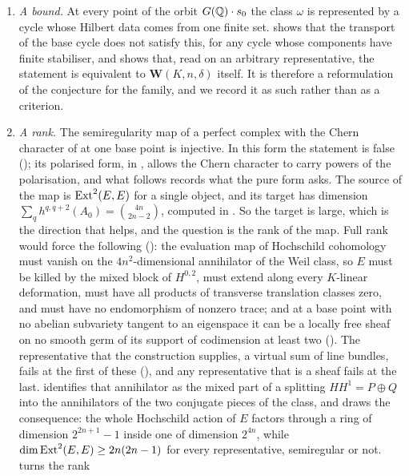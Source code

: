 \begin{remark}
\begin{enumerate}[label=\textup{(P\arabic*)},leftmargin=*]
\item \emph{A bound.} At every point of the orbit $G(\mathbb{Q})\cdot s_{0}$ the
  class $\omega$ is represented by a cycle whose Hilbert data comes from one
  finite set.  shows that the transport of the base cycle
  does not satisfy this, for any cycle whose components have finite
  stabiliser, and  shows that, read on an arbitrary
  representative, the statement is equivalent to $\mathbf{W}(K,n,\delta)$
  itself. It is therefore a reformulation of the conjecture for the family,
  and we record it as such rather than as a criterion.
\item \emph{A rank.} The semiregularity map of a perfect complex with the
  Chern character of  at one base point is injective.
  In this form the statement is false (); its polarised
  form, in , allows the Chern character to carry powers of
  the polarisation, and what follows records what the pure form asks. The
  source of the map is $\operatorname{Ext}^{2}(E,E)$ for a single object, and its target
  has dimension $\sum_{q}h^{q,q+2}(A_{0})=\binom{4n}{2n-2}$, computed in
  . So the target is large, which is the direction that
  helps, and the question is the rank of the map. Full rank would force the
  following (): the evaluation map of
  Hochschild cohomology must vanish on the $4n^{2}$-dimensional annihilator of
  the Weil class, so $E$ must be killed by the mixed block of $H^{0,2}$, must
  extend along every $K$-linear deformation, must have all products of
  transverse translation classes zero, and must have no endomorphism of
  nonzero trace; and at a base point with no abelian subvariety tangent to an
  eigenspace it can be a locally free sheaf on no smooth germ of its support
  of codimension at least two (). The representative that
  the construction supplies, a virtual sum of line bundles, fails at the first
  of these (), and any representative that is a
  sheaf fails at the last.  identifies that
  annihilator as the mixed part of a splitting $HH^{1}=P\oplus Q$ into the
  annihilators of the two conjugate pieces of the class, and
   draws the consequence: the whole Hochschild action of
  $E$ factors through a ring of dimension $2^{2n+1}-1$ inside one of
  dimension $2^{4n}$, while $\dim\operatorname{Ext}^{2}(E,E)\ge2n(2n-1)$ for every
  representative, semiregular or not.  turns the rank

\end{enumerate}
\end{remark}
